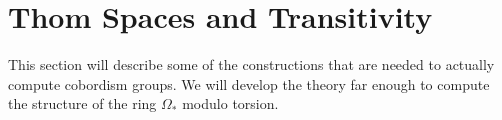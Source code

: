 \documentclass[../main]{subfiles}
\begin{document}
\chapter{Thom Spaces and Transitivity}\label{ch:18}
This section will describe some of the constructions that are needed to actually compute cobordism groups. We will develop the theory far enough to compute the structure of the ring $\Omega_\ast$ modulo torsion. 





\end{document}
